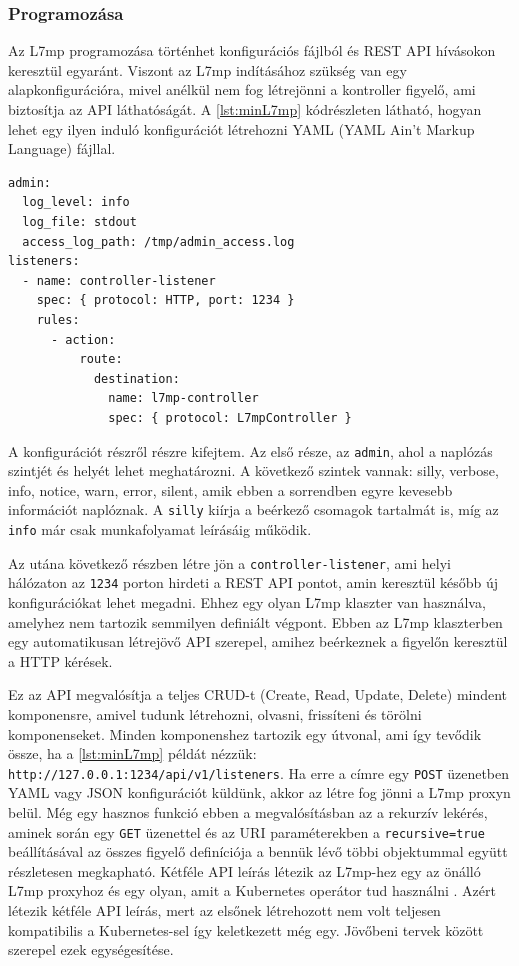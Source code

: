 \subsubsection{Programozása}

Az L7mp programozása történhet konfigurációs fájlból és REST API hívásokon keresztül
egyaránt. Viszont az L7mp indításához szükség van egy alapkonfigurációra, mivel
anélkül nem fog létrejönni a kontroller figyelő, ami biztosítja az API 
láthatóságát. A \ref{lst:minL7mp} kódrészleten látható, hogyan lehet egy ilyen induló 
konfigurációt létrehozni YAML (YAML Ain't Markup Language) fájllal.

\begin{lstlisting}[caption=L7mp minimális konfiguráció, label=lst:minL7mp]
admin:
  log_level: info
  log_file: stdout
  access_log_path: /tmp/admin_access.log
listeners:
  - name: controller-listener
    spec: { protocol: HTTP, port: 1234 }
    rules:
      - action:
          route:
            destination:
              name: l7mp-controller
              spec: { protocol: L7mpController }
\end{lstlisting}

A konfigurációt részről részre kifejtem. Az első része, az \texttt{admin}, ahol
a naplózás szintjét és helyét lehet meghatározni. A következő szintek vannak:
silly, verbose, info, notice, warn, error, silent, amik ebben a sorrendben
egyre kevesebb információt naplóznak. A \texttt{silly} kiírja a beérkező csomagok 
tartalmát is, míg az \texttt{info} már csak munkafolyamat leírásáig működik.

Az utána következő részben létre jön a \texttt{controller-listener}, ami helyi hálózaton 
az \texttt{1234} porton hirdeti a REST API pontot, amin keresztül később új 
konfigurációkat lehet megadni. Ehhez egy olyan L7mp klaszter van használva, amelyhez nem 
tartozik semmilyen definiált végpont. Ebben az L7mp klaszterben egy automatikusan 
létrejövő API szerepel, amihez beérkeznek a figyelőn keresztül a HTTP kérések. 

Ez az API megvalósítja a teljes CRUD-t (Create, Read, Update, Delete) mindent 
komponensre, amivel tudunk létrehozni, olvasni, frissíteni és törölni komponenseket. 
Minden komponenshez tartozik egy útvonal, ami így tevődik össze, ha a \ref{lst:minL7mp} 
példát nézzük: \texttt{http://127.0.0.1:1234/api/v1/listeners}. Ha erre a címre egy 
\texttt{POST} üzenetben YAML vagy JSON konfigurációt küldünk, akkor az létre fog jönni a 
L7mp proxyn belül. Még egy hasznos funkció ebben a megvalósításban az a rekurzív lekérés, 
aminek során egy \texttt{GET} üzenettel és az URI paraméterekben a 
\texttt{recursive=true} beállításával az összes figyelő definíciója a bennük lévő többi 
objektummal együtt részletesen megkapható. Kétféle  API leírás létezik az L7mp-hez egy az 
önálló L7mp proxyhoz \cite{proxy} és egy olyan, amit a Kubernetes operátor tud használni 
\cite{kubeProxy}. Azért létezik kétféle API leírás, mert az elsőnek létrehozott nem volt 
teljesen kompatibilis a Kubernetes-sel így keletkezett még egy. Jövőbeni tervek között 
szerepel ezek egységesítése.


